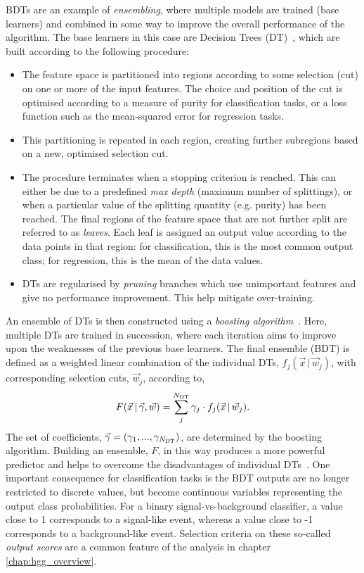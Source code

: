 BDTs are an example of \textit{ensembling}, where multiple models are trained (base learners) and combined in some way to improve the overall performance of the algorithm. The base learners in this case are Decision Trees (DT)~\cite{}, which are built according to the following procedure:

\begin{itemize}
    \item The feature space is partitioned into regions according to some selection (cut) on one or more of the input features. The choice and position of the cut is optimised according to a measure of purity for classification tasks, or a loss function such as the mean-squared error for regression tasks.
    
    \item This partitioning is repeated in each region, creating further subregions based on a new, optimised selection cut.
    
    \item The procedure terminates when a stopping criterion is reached. This can either be due to a predefined \textit{max depth} (maximum number of splittings), or when a particular value of the splitting quantity (e.g. purity) has been reached. The final regions of the feature space that are not further split are referred to as \textit{leaves}. Each leaf is assigned an output value according to the data points in that region: for classification, this is the most common output class; for regression, this is the mean of the data values.
    
    \item DTs are regularised by \textit{pruning} branches which use unimportant features and give no performance improvement. This help mitigate over-training.
\end{itemize}

An ensemble of DTs is then constructed using a \textit{boosting algorithm}~\cite{}. Here, multiple DTs are trained in succession, where each iteration aims to improve upon the weaknesses of the previous base learners. The final ensemble (BDT) is defined as a weighted linear combination of the individual DTs, $f_j(\vec{x}\,|\,\vec{w}_j)$, with corresponding selection cuts, $\vec{w}_j$, according to,
\begin{equation}
    F(\vec{x}\,|\,\vec{\gamma},\vec{w}) = \sum^{N_{\rm{DT}}}_j \gamma_j \cdot f_j(\vec{x}\,|\,\vec{w}_j).
\end{equation}
\noindent
The set of coefficients, $\vec{\gamma} = (\gamma_1,...,\gamma_{N_{\rm{DT}}})$, are determined by the boosting algorithm. Building an ensemble, $F$, in this way produces a more powerful predictor and helps to overcome the disadvantages of individual DTs~\cite{}. One important consequence for classification tasks is the BDT outputs are no longer restricted to discrete values, but become continuous variables representing the output class probabilities. For a binary signal-vs-background classifier, a value close to 1 corresponds to a signal-like event, whereas a value close to -1 corresponds to a background-like event. Selection criteria on these so-called \textit{output scores} are a common feature of the \Hgg analysis in chapter \ref{chap:hgg_overview}. 

